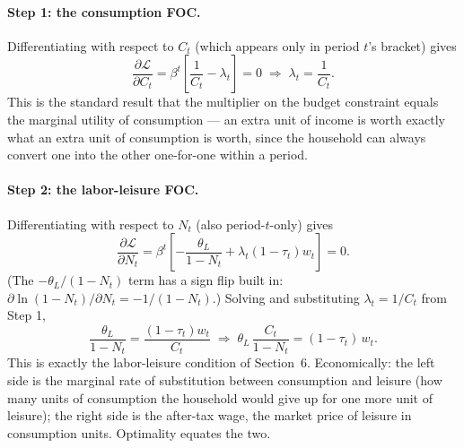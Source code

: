 \documentclass[11pt]{article}
\newcommand{\eq}[1]{\begin{equation}#1\end{equation}}
\begin{document}
\paragraph{Step 1: the consumption FOC.} Differentiating with respect to
$C_t$ (which appears only in period $t$'s bracket) gives
\eq{ \frac{\partial\mathcal{L}}{\partial C_t} = \beta^t\left[\frac{1}{C_t}-\lambda_t\right]=0 \;\Longrightarrow\; \lambda_t=\frac{1}{C_t}. \label{app:lambda} }
This is the standard result that the multiplier on the budget constraint
equals the marginal utility of consumption --- an extra unit of income is
worth exactly what an extra unit of consumption is worth, since the
household can always convert one into the other one-for-one within a
period.

\paragraph{Step 2: the labor-leisure FOC.} Differentiating with respect to
$N_t$ (also period-$t$-only) gives
\eq{
\frac{\partial\mathcal{L}}{\partial N_t}
= \beta^t\left[-\frac{\theta_L}{1-N_t}+\lambda_t(1-\tau_t)w_t\right]=0.
}
(The $-\theta_L/(1-N_t)$ term has a sign flip built in: $\partial
\ln(1-N_t)/\partial N_t=-1/(1-N_t)$.) Solving and substituting
$\lambda_t=1/C_t$ from Step 1,
\eq{ \frac{\theta_L}{1-N_t}=\frac{(1-\tau_t)w_t}{C_t} \;\Longrightarrow\; \boxed{\theta_L\,\frac{C_t}{1-N_t}=(1-\tau_t)\,w_t.} }
This is exactly the labor-leisure condition of Section~6. Economically:
the left side is the marginal rate of substitution between consumption and
leisure (how many units of consumption the household would give up for one
more unit of leisure); the right side is the after-tax wage, the market
price of leisure in consumption units. Optimality equates the two.
\end{document}

